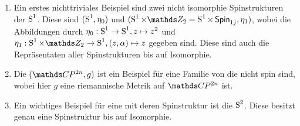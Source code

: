 \begin{Bsp}
\begin{enumerate}[(1)]
		\item Ein erstes nichttriviales Beispiel sind zwei nicht
		isomorphie Spinstrukturen der $\S^1$. Diese sind $(\S^1 , \eta_0)$ und $(\S^1 \times \Z_2 = \S^1 \times \spin{1j} , \eta_1)$, wobei die Abbildungen durch $\eta_0 : \S^1 \rightarrow \S^1 , z \mapsto z^2$ und $\eta_1 : \S^1 \times \Z_2 \rightarrow \S^1 , (z,\alpha) \mapsto z$ gegeben sind. Diese sind auch die Repräsentaten aller Spinstrukturen bis auf 
		Isomorphie. 
		\item Die $(\CP^{2n},g)$ ist ein Beispiel für eine Familie von
		\RMFen die nicht spin sind, wobei
		hier $g$ eine riemannische Metrik
		auf $\CP^{2n}$ ist. 
		\item Ein wichtiges Beispiel für eine \RMF mit deren Spinstruktur ist die $\S^2$. Diese
		besitzt genau eine Spinstruktur bis auf Isomorphie. 
	\end{enumerate}
\end{Bsp}







